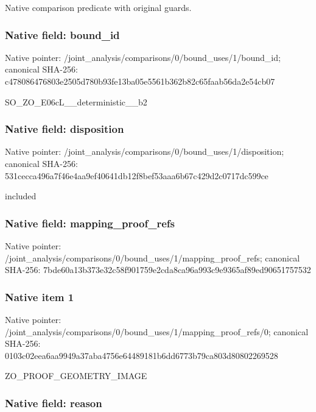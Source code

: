 \documentclass[10pt,a4paper]{article}
\begin{document}
Native comparison predicate with original guards.


\subsubsection{Native field: bound\_id}


Native pointer: /joint\_analysis/comparis\allowbreak{}ons/0/bound\_uses/1/bound\allowbreak{}\_id; canonical SHA-256: c478086476803e2505d780b9\allowbreak{}3fe13ba05e5561b362b82c65\allowbreak{}faab56da2e54cb07


SO\_ZO\_E06cL\_\_deterministic\_\_b2


\subsubsection{Native field: disposition}


Native pointer: /joint\_analysis/comparis\allowbreak{}ons/0/bound\_uses/1/dispo\allowbreak{}sition; canonical SHA-256: 531cecca496a7f46e4aa9ef4\allowbreak{}0641db12f8bef53aaa6b67c4\allowbreak{}29d2c0717dc599ce


included


\subsubsection{Native field: mapping\_proof\_refs}


Native pointer: /joint\_analysis/comparis\allowbreak{}ons/0/bound\_uses/1/mappi\allowbreak{}ng\_proof\_refs; canonical SHA-256: 7bde60a13b373e32c58f9017\allowbreak{}59e2cda8ca96a993c9e9365a\allowbreak{}f89ed90651757532



\subsubsection{Native item 1}


Native pointer: /joint\_analysis/comparis\allowbreak{}ons/0/bound\_uses/1/mappi\allowbreak{}ng\_proof\_refs/0; canonical SHA-256: 0103c02eea6aa9949a37aba4\allowbreak{}756e64489181b6dd6773b79c\allowbreak{}a803d80802269528


ZO\_PROOF\_GEOMETRY\_IMAGE


\subsubsection{Native field: reason}
\end{document}
